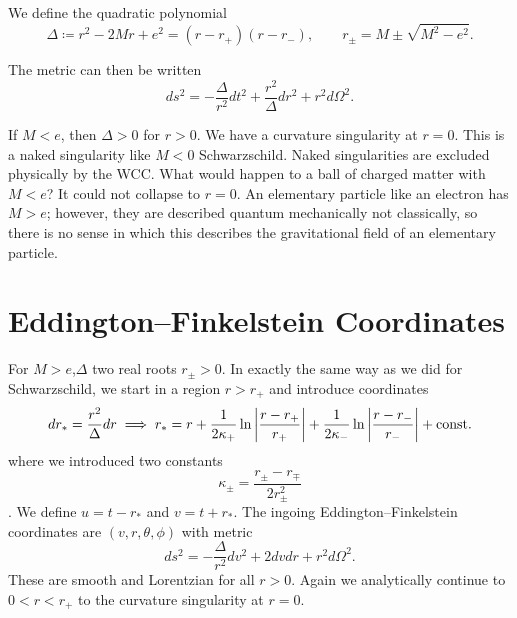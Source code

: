 
\begin{notation}[]
  We define the quadratic polynomial
  \begin{equation}
    \Delta \coloneqq r^2 - 2 M r + e^2 = (r - r_+) (r - r_-), \qquad r_{\pm} = M \pm \sqrt{M^2 - e^2}.
  \end{equation}
\end{notation}
The metric can then be written
\begin{equation}
  ds^2 = -\frac{\Delta}{r^2}  dt^2 + \frac{r^2}{\Delta} dr^2 + r^2 d\Omega^2.
\end{equation}

If $M < e$, then $\Delta > 0$ for $r > 0$. We have a curvature singularity at $r = 0$. This is a naked singularity like $M < 0$ Schwarzschild.
Naked singularities are excluded physically by the WCC.
What would happen to a ball of charged matter with $M < e$? It could not collapse to $r = 0$.
An elementary particle like an electron has $M > e$; however, they are described quantum mechanically not classically, so there is no sense in which this describes the gravitational field of an elementary particle.

\section{Eddington--Finkelstein Coordinates}%
\label{sec:eddington_finkelstein_coordinates}

For $M> e$,$\Delta$ two real roots $r_{\pm} > 0$.
In exactly the same way as we did for Schwarzschild, we start in a region $r > r_+$ and introduce coordinates
\begin{equation}
  dr_* = \frac{r^2}{\Delta} dr \implies r_* = r + \frac{1}{2 \kappa_+} \ln \abs{\frac{r - r_+}{r_+}} + \frac{1}{2 \kappa_-} \ln \abs{\frac{r - r_-}{r_-}} + \text{const.}
\end{equation}
where we introduced two constants 
\begin{equation}
  \label{eq:14-kappa}
  \kappa_{\pm} = \frac{r_{\pm} - r_{\mp}}{2 r_{\pm}^2}
\end{equation}.
We define $u = t - r_*$ and $v = t + r_*$. 
The ingoing Eddington--Finkelstein coordinates are $(v, r, \theta, \phi)$ with metric
\begin{equation}
  ds^2= - \frac{\Delta}{r^2} dv^2 + 2 d v d r + r^2 d\Omega^2.
\end{equation}
These are smooth and Lorentzian for all $r > 0$. Again we analytically continue to $0 < r < r_+$ to the curvature singularity at $r = 0$.


